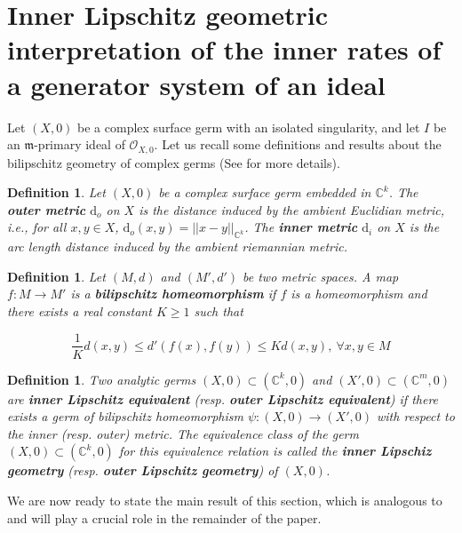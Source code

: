 \documentclass[reqno,dvipsnames,12pt]{amsart}
\newtheorem{prop}[thm]{Proposition}
\newtheorem{defi}[thm]{Definition}
\begin{document}
	
	
\section{Inner Lipschitz geometric interpretation of the inner rates of a generator system of an ideal}
  
  	Let $(X,0)$ be a complex surface germ with an isolated singularity, and let $I$ be an $\mathfrak{m}$-primary ideal of $\mathcal{O}_{X,0}$. Let us recall some definitions and results about the bilipschitz geometry of complex germs (See \cite{pichonintroduction} for more details). 

\begin{defi}
Let $(X,0)$ be a complex surface germ embedded in $\mathbb{C}^k$. The \textbf{outer metric} $\mathrm{d}_o$ on $X$ is the distance induced by the ambient Euclidian metric, i.e., for all $x,y \in X$, $\mathrm{d}_o(x,y)=|| x-y ||_{\mathbb{C}^k}$.
The \textbf{inner metric} $\mathrm{d}_i$ on $X$ is the arc length distance induced by the ambient riemannian metric.
\end{defi}
 \begin{defi}
 	Let $(M,d)$ and $(M',d')$ be two metric spaces. A map $f:M \longrightarrow M'$ is a \textbf{bilipschitz homeomorphism} if $f$ is a homeomorphism and there exists a real constant $K \geq 1$ such that 
 	
 	 $$ \frac{1}{K}d(x,y) \leq d'(f(x),f(y)) \leq Kd(x,y), \ \forall x,y \in M$$
 \end{defi}
		\begin{defi}\label{bilequiv}
			Two analytic germs $(X,0)\subset (\mathbb{C}^k,0)$ and $(X',0)\subset (\mathbb{C}^m,0)$ are \textbf{inner Lipschitz equivalent} (resp. \textbf{outer Lipschitz equivalent}) if there exists a germ of bilipschitz homeomorphism $\psi:(X,0) \longrightarrow (X',0)$	with respect to the inner (resp. outer) metric. The equivalence class of the germ $(X,0) \subset (\mathbb{C}^k,0)$ for this equivalence relation is called the \textbf{inner Lipschiz geometry} (resp. \textbf{outer Lipschitz geometry}) of $(X,0)$.	\end{defi}
We are now ready to state the main result of this section, which is analogous to \cite[Theorem C]{yenni2} and will play a crucial role in the remainder of the paper.
\end{document}
